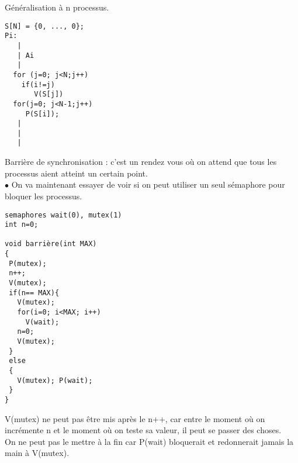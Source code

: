\documentclass[12pt,a4paper]{report}
\begin{document}
Généralisation à n processus.
\begin{center}
\end{center}
\medskip
\begin{verbatim}
S[N] = {0, ..., 0};
Pi:
   |
   | Ai
   |
  for (j=0; j<N;j++)
    if(i!=j)
       V(S[j])
  for(j=0; j<N-1;j++)
     P(S[i]);
   |
   |
   |
\end{verbatim} 
\medskip
  
Barrière de synchronisation : c'est un rendez vous où on attend que tous les processus aient atteint un certain point.\\

$\bullet$ On va maintenant essayer de voir si on peut utiliser un seul sémaphore pour bloquer les processus.
\medskip
\begin{verbatim}
semaphores wait(0), mutex(1)
int n=0;

void barrière(int MAX)
{
 P(mutex);
 n++;
 V(mutex);
 if(n== MAX){
   V(mutex);
   for(i=0; i<MAX; i++) 
     V(wait);
   n=0;
   V(mutex);
 }
 else
 {
   V(mutex); P(wait);
 }
}
\end{verbatim} 
\medskip

V(mutex) ne peut pas être mis après le n++, car entre le moment où on incrémente n et le moment où on teste sa valeur, il peut se passer des choses.\\
On ne peut pas le mettre à la fin car P(wait) bloquerait et redonnerait jamais la main à V(mutex).\\
\end{document}
